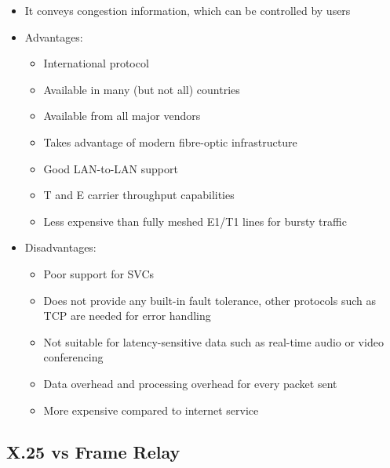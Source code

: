 \begin{itemize}
\begin{itemize}
\begin{itemize}
    \end{itemize}
  \end{itemize}
  \item It conveys congestion information, which can be controlled by users
  \item Advantages:
  \begin{itemize}
    \item International protocol
    \item Available in many (but not all) countries
    \item Available from all major vendors
    \item Takes advantage of modern fibre-optic infrastructure
    \item Good LAN-to-LAN support
    \item T and E carrier throughput capabilities
    \item Less expensive than fully meshed E1/T1 lines for bursty traffic
  \end{itemize}
  \item Disadvantages:
  \begin{itemize}
    \item Poor support for SVCs
    \item Does not provide any built-in fault tolerance, other protocols such as TCP are needed for error handling
    \item Not suitable for latency-sensitive data such as real-time audio or video conferencing
    \item Data overhead and processing overhead for every packet sent
    \item More expensive compared to internet service
  \end{itemize}
\end{itemize}

\subsection*{X.25 vs Frame Relay}

